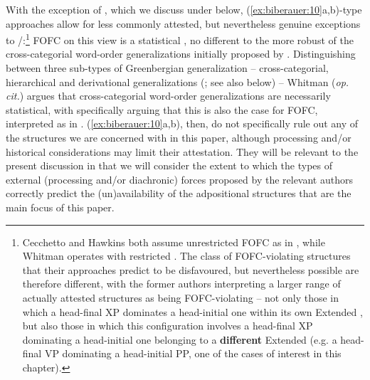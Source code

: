 \documentclass[output=paper]{LSP/langsci}
\begin{document}
With the exception of \citet{Cecchetto2013}, which we discuss under  below, (\ref{ex:biberauer:10}a,b)-type approaches allow for less commonly attested, but nevertheless genuine exceptions to /:\footnote{Cecchetto and Hawkins both assume unrestricted FOFC as in , while Whitman operates with restricted . The class of FOFC-violating structures that their approaches predict to be disfavoured, but nevertheless possible are therefore different, with the former authors interpreting a larger range of actually attested structures as being FOFC-violating – not only those in which a head-final XP dominates a head-initial one within its own Extended , but also those in which this configuration involves a head-final XP dominating a head-initial one belonging to a \textbf{different} Extended  (e.g. a head-final VP dominating a head-initial PP, one of the cases of interest in this chapter).} FOFC on this view is a statistical , no different to the more robust of the cross-categorial word-order generalizations initially proposed by \citet{greenberg1963}. Distinguishing between three sub-types of Greenbergian generalization – cross-categorial, hierarchical and derivational generalizations (\citealt[234]{Whitman2008}; see also  below) – Whitman (\textit{op. cit.}) argues that cross-categorial word-order generalizations are necessarily statistical, with \citet{Whitman2013} specifically arguing that this is also the case for FOFC, interpreted as in . (\ref{ex:biberauer:10}a,b), then, do not specifically rule out any of the structures we are concerned with in this paper, although processing and/or historical considerations may limit their attestation. They will be relevant to the present discussion in that we will consider the extent to which the types of external (processing and/or diachronic) forces proposed by the relevant authors correctly predict the (un)availability of the adpositional structures that are the main focus of this paper.
\end{document}
